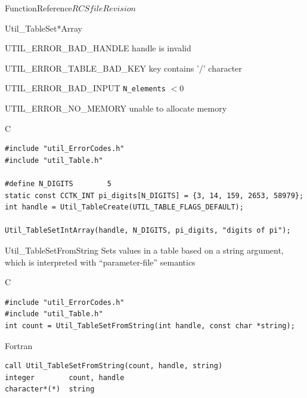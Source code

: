 \begin{cactuspart}{FunctionReference}{$RCSfile$}{$Revision$}
\begin{FunctionDescription}{Util\_TableSet*Array}
\begin{ErrorSection}
\begin{Error}{UTIL\_ERROR\_BAD\_HANDLE}
handle is invalid
\end{Error}
\begin{Error}{UTIL\_ERROR\_TABLE\_BAD\_KEY}
key contains '/' character
\end{Error}
\begin{Error}{UTIL\_ERROR\_BAD\_INPUT}
\verb|N_elements| $< 0$
\end{Error}
\begin{Error}{UTIL\_ERROR\_NO\_MEMORY}
unable to allocate memory
\end{Error}
\end{ErrorSection}

\begin{ExampleSection}
\begin{Example}{C}
\begin{verbatim}
#include "util_ErrorCodes.h"
#include "util_Table.h"

#define N_DIGITS        5
static const CCTK_INT pi_digits[N_DIGITS] = {3, 14, 159, 2653, 58979};
int handle = Util_TableCreate(UTIL_TABLE_FLAGS_DEFAULT);

Util_TableSetIntArray(handle, N_DIGITS, pi_digits, "digits of pi");
\end{verbatim}
\end{Example}
\end{ExampleSection}
\end{FunctionDescription}


\begin{FunctionDescription}{Util\_TableSetFromString}
\label{Util-TableSetFromString}
Sets values in a table based on a string argument, which is interpreted
with ``parameter-file'' semantics

\begin{SynopsisSection}
\begin{Synopsis}{C}
\begin{verbatim}
#include "util_ErrorCodes.h"
#include "util_Table.h"
int count = Util_TableSetFromString(int handle, const char *string);
\end{verbatim}
\end{Synopsis}
\begin{Synopsis}{Fortran}
\begin{verbatim}
call Util_TableSetFromString(count, handle, string)
integer        count, handle
character*(*)  string
\end{verbatim}
\end{Synopsis}
\end{SynopsisSection}


\end{FunctionDescription}
\end{cactuspart}
